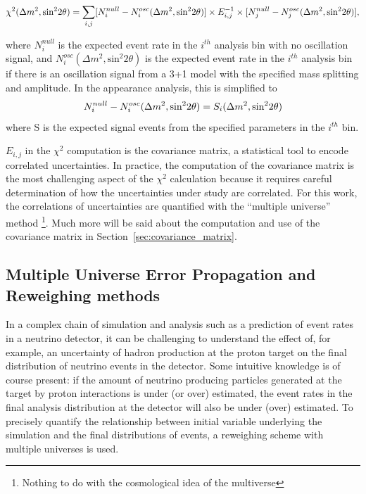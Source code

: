 \begin{equation}
\begin{centering}
\chi^2(\Delta m^2, \text{sin}^2 2 \theta ) = \sum_{i,j} [N^{null}_i - N^{osc}_i(\Delta m^2, \text{sin}^2 2 \theta ) ] \times E^{-1}_{i,j} \times [N^{null}_j - N^{osc}_j(\Delta m^2, \text{sin}^2 2 \theta ) ],
\end{centering}
\end{equation}

where $N^{null}_i$ is the expected event rate in the $i^{th}$ analysis bin with no oscillation signal, and $N^{osc}_i(\Delta m^2, \text{sin}^2 2 \theta )$ is the expected event rate in the $i^{th}$ analysis bin if there is an oscillation signal from a 3+1 model with the specified mass splitting and amplitude.  In the \nue appearance analysis, this is simplified to 
\begin{equation}
\begin{centering}
N^{null}_i - N^{osc}_i(\Delta m^2, \text{sin}^2 2 \theta ) = S_i(\Delta m^2, \text{sin}^2 2 \theta )
\end{centering}
\end{equation}
where S is the expected signal events from the specified parameters in the $i^{th}$ bin.

$E_{i,j}$ in the $\chi^2$ computation is the covariance matrix, a statistical tool to encode correlated uncertainties.  In practice, the computation of the covariance matrix is the most challenging aspect of the $\chi^2$ calculation because it requires careful determination of how the uncertainties under study are correlated.  For this work, the correlations of uncertainties are quantified with the ``multiple universe'' method \footnote{Nothing to do with the cosmological idea of the multiverse}.  Much more will be said about the computation and use of the covariance matrix in Section~\ref{sec:covariance_matrix}.

\subsection{Multiple Universe Error Propagation and Reweighing methods}

In a complex chain of simulation and analysis such as a prediction of event rates in a neutrino detector, it can be challenging to understand the effect of, for example, an uncertainty of hadron production at the proton target on the final distribution of neutrino events in the detector.  Some intuitive knowledge is of course present: if the amount of neutrino producing particles generated at the target by proton interactions is under (or over) estimated, the event rates in the final analysis distribution at the detector will also be under (over) estimated.  To precisely quantify the relationship between initial variable underlying the simulation and the final distributions of events, a reweighing scheme with multiple universes is used.

